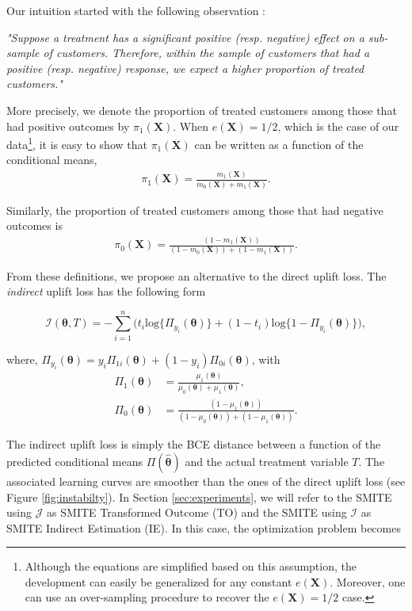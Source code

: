 \documentclass{article}
\def\X{\mathbf X}
\begin{document}
Our intuition started with the following observation :

	{\it "Suppose a treatment has a significant positive (resp. negative) effect on a sub-sample of customers. Therefore, within the sample of customers that had a positive (resp. negative) response, we expect a higher proportion of treated customers."}

More precisely, we denote the proportion of treated customers among those that had positive outcomes by $\pi_1(\X)$. When $e(\X) = 1/2$, which is the case of our data\footnote{Although the equations are simplified based on this assumption, the development can easily be generalized for any constant $e(\X)$. Moreover, one can use an over-sampling procedure to recover the $e(\X) = 1/2$ case.}, it is easy to show that $\pi_1(\X)$ can be written as a function of the conditional means, 
\begin{align*}
    \pi_1(\X) = \frac{m_1(\X)}{m_0(\X) + m_1(\X)}.
\end{align*}

Similarly, the proportion of treated customers among those that had negative outcomes is
\begin{align*}
    \pi_0(\X) = \frac{(1-m_1(\X))}{(1-m_0(\X)) +(1- m_1(\X))}.
\end{align*}

From these definitions, we propose an alternative to the direct uplift loss. The \textit{indirect} uplift loss has the following form

\begin{equation*}
    \mathcal{I}(\boldsymbol{\theta}, 
    T) =   - \sum_{i=1}^{n} \Big( t_i\mathrm{log} \{\Pi_{y_i}(\boldsymbol{\theta})\} + (1-t_i) \mathrm{log} \{1-\Pi_{y_i}(\boldsymbol{\theta})\} \Big),
\end{equation*}

where, $\Pi_{y_i}(\boldsymbol{\theta}) = y_i \Pi_{1i}(\boldsymbol{\theta}) + (1-y_i) \Pi_{0i}(\boldsymbol{\theta})$, with
\begin{align*}
    \Pi_1(\boldsymbol{\theta}) &= \frac{\mu_1(\boldsymbol{\theta})}{\mu_0(\boldsymbol{\theta}) +\mu_1(\boldsymbol{\theta})}, \\
    \Pi_0(\boldsymbol{\theta}) &= \frac{(1-\mu_1(\boldsymbol{\theta}))}{(1-\mu_0(\boldsymbol{\theta})) +(1- \mu_1(\boldsymbol{\theta}))}.
\end{align*}

The indirect uplift loss is simply the BCE distance between a function of the predicted conditional means $\Pi(\boldsymbol{\hat\theta})$ and the actual treatment variable $T$. The associated learning curves are smoother than the ones of the direct uplift loss (see Figure \ref{fig:instabilty}). In Section \ref{sec:experiments}, we will refer to the SMITE using $\mathcal{J}$ as SMITE Transformed Outcome (TO) and the SMITE using  $\mathcal{I}$ as SMITE Indirect Estimation (IE). In this case, the optimization problem becomes
\end{document}
